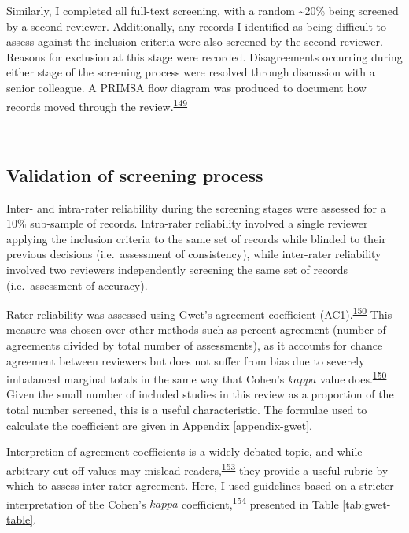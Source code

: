 \documentclass[a4paper, twoside]{templates/ociamthesis}
\begin{document}
Similarly, I completed all full-text screening, with a random \textasciitilde20\% being screened by a second reviewer. Additionally, any records I identified as being difficult to assess against the inclusion criteria were also screened by the second reviewer. Reasons for exclusion at this stage were recorded. Disagreements occurring during either stage of the screening process were resolved through discussion with a senior colleague. A PRIMSA flow diagram was produced to document how records moved through the review.\textsuperscript{\protect\hyperlink{ref-page2021}{149}}

~

\hypertarget{validation-of-screening-process}{%
\subsection{Validation of screening process}\label{validation-of-screening-process}}

Inter- and intra-rater reliability during the screening stages were assessed for a 10\% sub-sample of records. Intra-rater reliability involved a single reviewer applying the inclusion criteria to the same set of records while blinded to their previous decisions (i.e.~assessment of consistency), while inter-rater reliability involved two reviewers independently screening the same set of records (i.e.~assessment of accuracy).

Rater reliability was assessed using Gwet's agreement coefficient (AC1).\textsuperscript{\protect\hyperlink{ref-gwet2008}{150}} This measure was chosen over other methods such as percent agreement (number of agreements divided by total number of assessments), as it accounts for chance agreement between reviewers but does not suffer from bias due to severely imbalanced marginal totals in the same way that Cohen's \(kappa\) value does.\textsuperscript{\protect\hyperlink{ref-gwet2008}{150}} Given the small number of included studies in this review as a proportion of the total number screened, this is a useful characteristic. The formulae used to calculate the coefficient are given in Appendix \ref{appendix-gwet}.

Interpretion of agreement coefficients is a widely debated topic, and while arbitrary cut-off values may mislead readers,\textsuperscript{\protect\hyperlink{ref-brennan1992}{153}} they provide a useful rubric by which to assess inter-rater agreement. Here, I used guidelines based on a stricter interpretation of the Cohen's \(kappa\) coefficient,\textsuperscript{\protect\hyperlink{ref-mchugh2012}{154}} presented in Table \ref{tab:gwet-table}.
\end{document}
